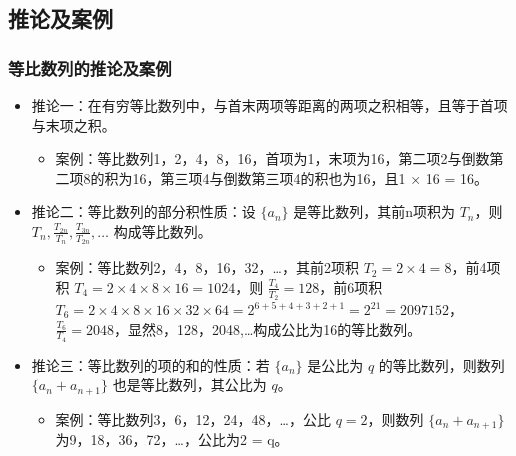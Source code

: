 \documentclass{ctexbeamer}
\begin{document}
\subsection{推论及案例}
\begin{frame}[t]
\frametitle{等比数列的推论及案例}
\begin{itemize}
    \item 推论一：在有穷等比数列中，与首末两项等距离的两项之积相等，且等于首项与末项之积。
        \begin{itemize}
            \item 案例：等比数列1，2，4，8，16，首项为1，末项为16，第二项2与倒数第二项8的积为16，第三项4与倒数第三项4的积也为16，且1 × 16 = 16。
        \end{itemize}
    \item 推论二：等比数列的部分积性质：设 $\{a_n\}$ 是等比数列，其前n项积为 $T_n$，则 $T_n, \frac{T_{2n}}{T_n}, \frac{T_{3n}}{T_{2n}}, \ldots$ 构成等比数列。
        \begin{itemize}
            \item 案例：等比数列2，4，8，16，32，…，其前2项积 $T_2 = 2 × 4 = 8$，前4项积 $T_4 = 2 × 4 × 8 × 16 = 1024$，则 $\frac{T_4}{T_2} = 128$，前6项积 $T_6 = 2 × 4 × 8 × 16 × 32 × 64 = 2^{6+5+4+3+2+1} = 2^{21} = 2097152$，$\frac{T_6}{T_4} = 2048$，显然8，128，2048,…构成公比为16的等比数列。
        \end{itemize}
    \item 推论三：等比数列的项的和的性质：若 $\{a_n\}$ 是公比为 $q$ 的等比数列，则数列 $\{a_n + a_{n+1}\}$ 也是等比数列，其公比为 $q$。
        \begin{itemize}
            \item 案例：等比数列3，6，12，24，48，…，公比 $q = 2$，则数列 $\{a_n + a_{n+1}\}$ 为9，18，36，72，…，公比为2 = q。
        \end{itemize}
\end{itemize}
\end{frame}
\end{document}
